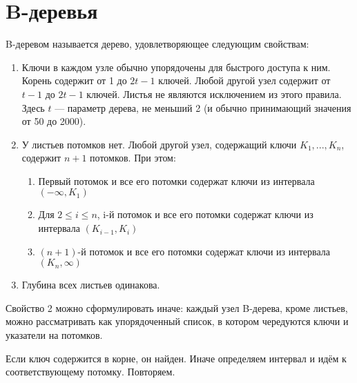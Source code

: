 \documentclass[discrete.tex]{subfiles}
\begin{document}
  \section{B-деревья}

  \begin{definition}
    B-деревом называется дерево, удовлетворяющее следующим свойствам:
    \begin{enumerate}
      \item Ключи в каждом узле обычно упорядочены для быстрого доступа к ним. Корень содержит от 1 до $2t-1$ ключей. Любой другой узел содержит от $t-1$ до $2t-1$ ключей. Листья не являются исключением из этого правила. Здесь $t$ — параметр дерева, не меньший 2 (и обычно принимающий значения от 50 до 2000).
      \item У листьев потомков нет. Любой другой узел, содержащий ключи $K_1, ..., K_n$, содержит $n+1$ потомков. При этом:
      \begin{enumerate}
        \item Первый потомок и все его потомки содержат ключи из интервала
        $(-\infty ,K_{1})$
        \item Для $2\leq i\leq n$, i-й потомок и все его потомки содержат ключи из интервала $(K_{i-1},K_i)$
        \item $(n+1)$-й потомок и все его потомки содержат ключи из интервала
        $(K_n,\infty )$
      \end{enumerate}
      \item Глубина всех листьев одинакова.
    \end{enumerate}

    Свойство 2 можно сформулировать иначе: каждый узел B-дерева, кроме листьев, можно рассматривать как упорядоченный список, в котором чередуются ключи и указатели на потомков.
  \end{definition}

  \begin{alg}
    Если ключ содержится в корне, он найден. Иначе определяем интервал и идём к соответствующему потомку. Повторяем.
  \end{alg}
\end{document}
